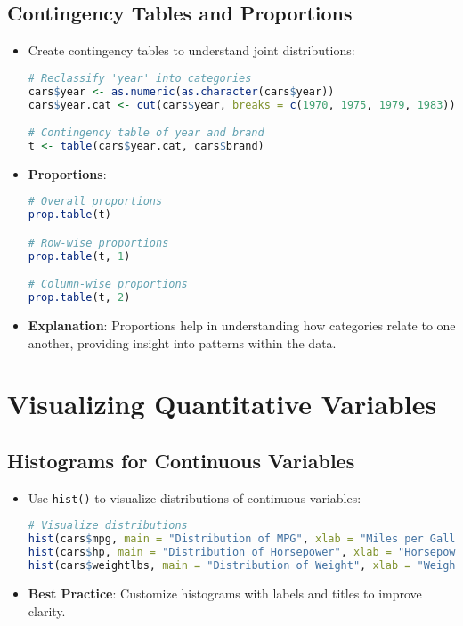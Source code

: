 \documentclass{article}
\begin{document}
\subsection{Contingency Tables and Proportions}
\begin{itemize}
    \item Create contingency tables to understand joint distributions:
\begin{lstlisting}[language=R]
# Reclassify 'year' into categories
cars$year <- as.numeric(as.character(cars$year))
cars$year.cat <- cut(cars$year, breaks = c(1970, 1975, 1979, 1983))

# Contingency table of year and brand
t <- table(cars$year.cat, cars$brand)
\end{lstlisting}

\item \textbf{Proportions}:
\begin{lstlisting}[language=R]
# Overall proportions
prop.table(t)

# Row-wise proportions
prop.table(t, 1)

# Column-wise proportions
prop.table(t, 2)
\end{lstlisting}
\item \textbf{Explanation}: Proportions help in understanding how categories relate to one another, providing insight into patterns within the data.
\end{itemize}

\section{Visualizing Quantitative Variables}
\subsection{Histograms for Continuous Variables}
\begin{itemize}
    \item Use \texttt{hist()} to visualize distributions of continuous variables:
\begin{lstlisting}[language=R]
# Visualize distributions
hist(cars$mpg, main = "Distribution of MPG", xlab = "Miles per Gallon")
hist(cars$hp, main = "Distribution of Horsepower", xlab = "Horsepower")
hist(cars$weightlbs, main = "Distribution of Weight", xlab = "Weight (lbs)")
\end{lstlisting}
    \item \textbf{Best Practice}: Customize histograms with labels and titles to improve clarity.
\end{itemize}
\end{document}
